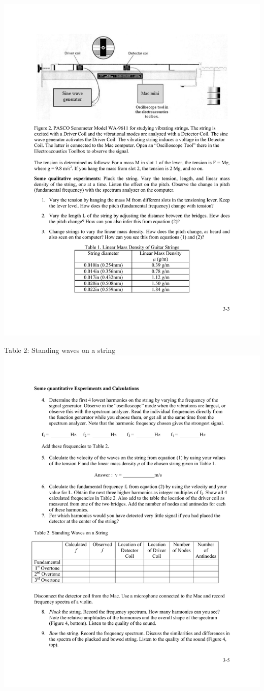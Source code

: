 \documentclass[11pt]{NSF}
\begin{document}
%
\begin{table}[hbtp]
\begin{center}
\includegraphics[width=.65\textwidth]{tab3_1}
\label{t:1}
\end{center}
\end{table}
%
%
\begin{table}[hbtp]
\begin{center}
Table 2: Standing waves on a string\\
\includegraphics[width=.95\textwidth]{tab3_2}
\label{t:2}
\end{center}
\end{table}
%
\end{document}
